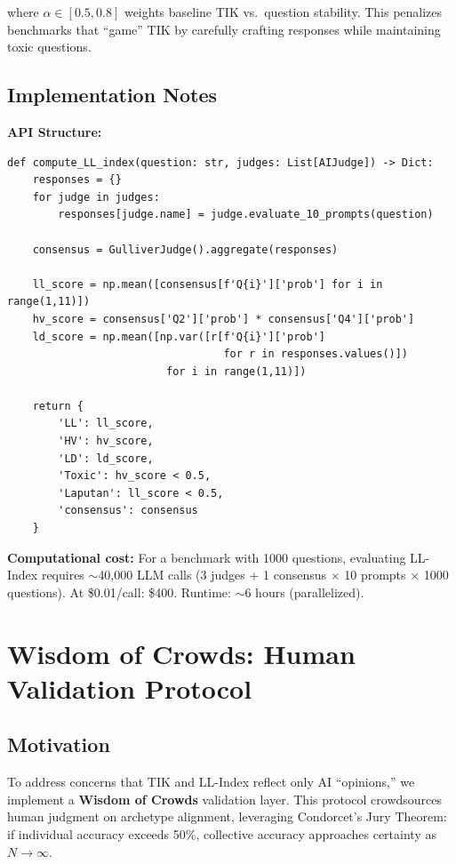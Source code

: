 \documentclass[11pt,a4paper]{article}
\theoremstyle{definition}
\theoremstyle{remark}
\begin{document}
where $\alpha \in [0.5, 0.8]$ weights baseline TIK vs.\ question stability. 
This penalizes benchmarks that ``game'' TIK by carefully crafting responses 
while maintaining toxic questions.

\subsection{Implementation Notes}

\textbf{API Structure:}
\begin{verbatim}
def compute_LL_index(question: str, judges: List[AIJudge]) -> Dict:
    responses = {}
    for judge in judges:
        responses[judge.name] = judge.evaluate_10_prompts(question)
    
    consensus = GulliverJudge().aggregate(responses)
    
    ll_score = np.mean([consensus[f'Q{i}']['prob'] for i in range(1,11)])
    hv_score = consensus['Q2']['prob'] * consensus['Q4']['prob']
    ld_score = np.mean([np.var([r[f'Q{i}']['prob'] 
                                  for r in responses.values()]) 
                         for i in range(1,11)])
    
    return {
        'LL': ll_score,
        'HV': hv_score,
        'LD': ld_score,
        'Toxic': hv_score < 0.5,
        'Laputan': ll_score < 0.5,
        'consensus': consensus
    }
\end{verbatim}

\textbf{Computational cost:} For a benchmark with 1000 questions, evaluating 
LL-Index requires $\sim$40,000 LLM calls (3 judges + 1 consensus × 10 prompts × 
1000 questions). At \$0.01/call: \$400. Runtime: $\sim$6 hours (parallelized).


\section{Wisdom of Crowds: Human Validation Protocol}
\label{app:wisdom-crowds}

\subsection{Motivation}

To address concerns that TIK and LL-Index reflect only AI ``opinions,'' we 
implement a \textbf{Wisdom of Crowds} validation layer. This protocol crowdsources 
human judgment on archetype alignment, leveraging Condorcet's Jury Theorem: if 
individual accuracy exceeds 50\%, collective accuracy approaches certainty as 
$N \to \infty$.
\end{document}
